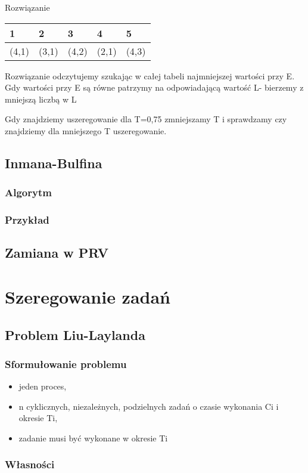 \documentclass[12pt,a4paper]{article}
\begin{document}
Rozwiązanie
\begin{center}
    \begin{tabular}{ |l|l|l|l|l|}
    \hline
		1&2&3&4&5\\ \hline
		(4,1)&(3,1)&(4,2)&(2,1)&(4,3)\\ \hline
    \end{tabular}
\end{center}
Rozwiązanie odczytujemy szukając w całej tabeli najmniejszej wartości przy E. Gdy wartości przy E są równe patrzymy na odpowiadającą wartość L- bierzemy z mniejszą liczbą w L

Gdy znajdziemy uszeregowanie dla T=0,75 zmniejszamy T i sprawdzamy czy znajdziemy dla mniejszego T uszeregowanie.

\subsection{Inmana-Bulfina}
\subsubsection{Algorytm}
\subsubsection{Przykład}
\subsection{Zamiana w PRV}
\section{Szeregowanie zadań}
\subsection{Problem Liu-Laylanda}
\subsubsection{Sformułowanie problemu}
\begin{itemize}
\item jeden proces,
\item n cyklicznych, niezależnych, podzielnych zadań o czasie wykonania Ci i okresie Ti,
\item zadanie musi być wykonane w okresie Ti
\end{itemize}
\subsubsection{Własności}
\end{document}

